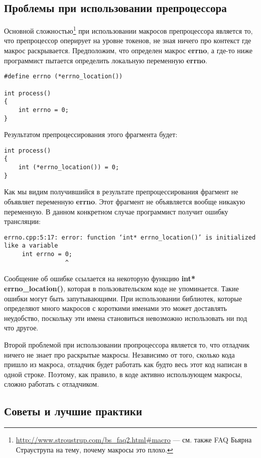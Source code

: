 \subsection{Проблемы при использовании препроцессора}
Основной сложностью\footnote{\url{http://www.stroustrup.com/bs_faq2.html\#macro} --- см. также FAQ Бьярна Страуструпа на тему, почему макросы это плохо.} при использовании макросов препроцессора является то, что препроцессор оперирует на уровне токенов, не зная ничего про контекст где макрос раскрывается. Предположим, что определен макрос {\bf errno}, а где-то ниже программист пытается определить локальную переменную {\bf errno}.
\begin{verbatim}
#define errno (*errno_location())

int process()
{
    int errno = 0;
}
\end{verbatim}
Результатом препроцессирования этого фрагмента будет:
\begin{verbatim}
int process()
{
    int (*errno_location()) = 0;
}
\end{verbatim}
Как мы видим получившийся в результате препроцессирования фрагмент не объявляет переменную {\bf errno}. Этот фрагмент не объявляется вообще никакую переменную. В данном конкретном случае программист получит ошибку трансляции:
\begin{verbatim}
errno.cpp:5:17: error: function ‘int* errno_location()’ is initialized like a variable
     int errno = 0;
                 ^
\end{verbatim}
Сообщение об ошибке ссылается на некоторую функцию {\bf int* errno\_location()}, которая в пользовательском коде не упоминается. Такие ошибки могут быть запутывающими. При использовании библиотек, которые определяют много макросов с короткими именами это может доставлять неудобство, поскольку эти имена становиться невозможно использовать ни под что другое.

Второй проблемой при использовании пропроцессора является то, что отладчик ничего не знает про раскрытые макросы. Независимо от того, сколько кода пришло из макроса, отладчик будет работать как будто весь этот код написан в одной строке. Поэтому, как правило, в коде активно использующем макросы, сложно работать с отладчиком.

\subsection{Советы и лучшие практики}
